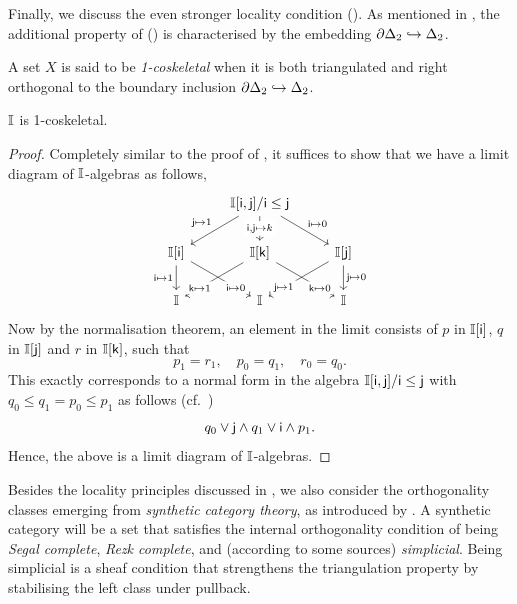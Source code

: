 Finally, we discuss the even stronger locality condition (\AxiomOneCS). As mentioned in , the additional property of (\AxiomOneCS) is characterised by the embedding $\partial\Delta_2 \hookrightarrow \Delta_2$.

\begin{definition}
  A set $X$ is said to be \emph{1-coskeletal} when it is both triangulated and right orthogonal to the boundary inclusion $\partial\Delta_2 \hookrightarrow \Delta_2$.
\end{definition}

\begin{proposition}[\AxiomSQCF]\label{specis1t}
  $\mathbb{I}$ is 1-coskeletal.
\end{proposition}
\begin{proof}
  Completely similar to the proof of , it suffices to show that we have a limit diagram of $\mathbb{I}$-algebras as follows,
  \[\begin{tikzcd}
    & {\mbb{I}[\ms{i},\ms{j}]/\ms{i}\le \ms{j}} \\
    \mbb{I}[\ms{i}] & \mbb{I}[\ms{k}] & \mbb{I}[\ms{j}] \\
    \mbb{I} & \mbb{I} & \mbb{I}
    \arrow["{\ms{j} \mapsto 1}"', from=1-2, to=2-1]
    \arrow["{\ms{i},\ms{j} \mapsto k}"{description}, from=1-2, to=2-2]
    \arrow["{\ms{i}\mapsto 0}", from=1-2, to=2-3]
    \arrow["\ms{i}\mapsto 1"', from=2-1, to=3-1]
    \arrow["\ms{i}\mapsto 0"{description, pos=0.75}, from=2-1, to=3-2]
    \arrow["\ms{k}\mapsto 1"{description, pos=0.75}, from=2-2, to=3-1]
    \arrow["\ms{k}\mapsto 0"{description, pos=0.75}, from=2-2, to=3-3]
    \arrow["\ms{j}\mapsto 1"{description, pos=0.75}, from=2-3, to=3-2]
    \arrow["\ms{j}\mapsto 0", from=2-3, to=3-3]
  \end{tikzcd}\]
  Now by the normalisation theorem, an element in the limit consists of $p$ in $\mathbb{I}[\mathsf{i}]$, $q$ in $\mathbb{I}[\mathsf{j}]$ and $r$ in $\mathbb{I}[\mathsf{k}]$, such that
  \[ p_1 = r_1, \quad p_0 = q_1, \quad r_0 = q_0\text{.} \]
  This exactly corresponds to a normal form in the algebra $\mathbb{I}[\mathsf{i},\mathsf{j}]/\mathsf{i}\le\mathsf{j}$ with $q_0 \le q_1 = p_0 \le p_1$ as follows (cf.\ )
  \[ q_0 \vee \mathsf{j} \wedge q_1 \vee \mathsf{i} \wedge p_1\text{.} \]
  Hence, the above is a limit diagram of $\mathbb{I}$-algebras.
\end{proof}

Besides the locality principles discussed in , we also consider the orthogonality classes emerging from \emph{synthetic category theory}, as introduced by \citet{riehl2017type}. 
A synthetic category will be a set that satisfies the internal orthogonality condition of being \emph{Segal complete}, \emph{Rezk complete}, and (according to some sources) \emph{simplicial}. Being simplicial is a sheaf condition that strengthens the triangulation property by stabilising the left class under pullback.

